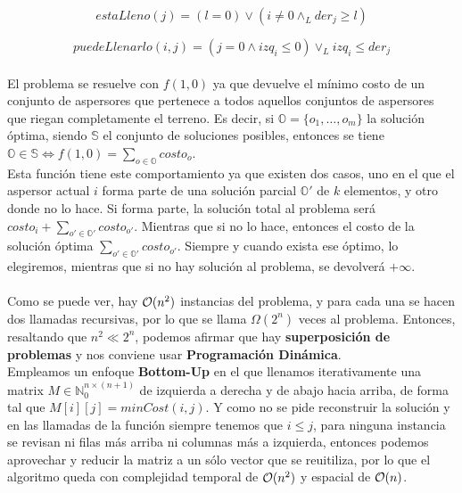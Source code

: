 \documentclass[./main.tex]{subfiles}
\begin{document}
\begin{equation}
 estaLleno(j) = (l = 0) \lor (i \neq 0 \land_L der_j \geq l)
\end{equation}

\begin{equation}
 puedeLlenarlo(i, j) = (j = 0 \land izq_i \leq 0) \lor_L izq_i \leq der_j
\end{equation}

\paragraph{} El problema se resuelve con \(f(1, 0)\) ya que devuelve el mínimo costo de un conjunto de aspersores que pertenece a todos aquellos conjuntos de aspersores que riegan completamente el terreno. Es decir, si \(\mathbb{O} = \{o_1, \ldots, o_m\}\) la solución óptima, siendo \(\mathbb{S}\) el conjunto de soluciones posibles, entonces se tiene \(\mathbb{O} \in \mathbb{S} \iff f(1, 0) = \sum_{o \in \mathbb{O}}costo_o\). \\
Esta función tiene este comportamiento ya que existen dos casos, uno en el que el aspersor actual \(i\) forma parte de una solución parcial \(\mathbb{O}'\) de \(k\) elementos, y otro donde no lo hace. Si forma parte, la solución total al problema será \(costo_i + \sum_{o' \in \mathbb{O}'}costo_{o'}\). Mientras que si no lo hace, entonces el costo de la solución óptima \(\sum_{o' \in \mathbb{O}'}costo_{o'}\). Siempre y cuando exista ese óptimo, lo elegiremos, mientras que si no hay solución al problema, se devolverá \(+\infty\).

\paragraph{} Como se puede ver, hay \(\mathcal{O}(n^2)\) instancias del problema, y para cada una se hacen dos llamadas recursivas, por lo que se llama \(\Omega(2^n)\) veces al problema. Entonces, resaltando que \(n^2 \ll 2^n\), podemos afirmar que hay \textbf{superposición de problemas} y nos conviene usar \textbf{Programación Dinámica}. \\
Empleamos un enfoque \textbf{Bottom-Up} en el que llenamos iterativamente una matrix \(M \in \mathbb{N}_0^{n \times (n+1)}\) de izquierda a derecha y de abajo hacia arriba, de forma tal que \(M[i][j] = minCost(i, j)\). Y como no se pide reconstruir la solución y en las llamadas de la función siempre tenemos que \(i \leq j\), para ninguna instancia se revisan ni filas más arriba ni columnas más a izquierda, entonces podemos aprovechar y reducir la matriz a un sólo vector que se reuitiliza, por lo que el algoritmo queda con complejidad temporal de \(\mathcal{O}(n^2)\) y espacial de \(\mathcal{O}(n)\).
\end{document}
